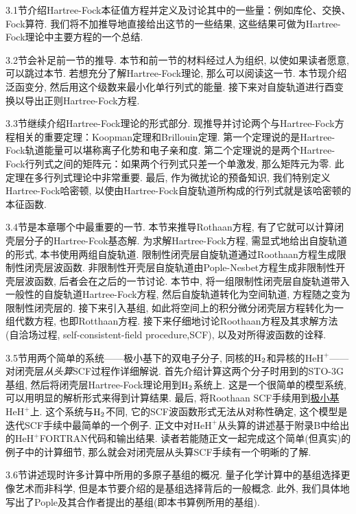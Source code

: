 3.1节介绍Hartree-Fock本征值方程并定义及讨论其中的一些量：例如库伦、交换、Fock算符. 我们将不加推导地直接给出这节的一些结果, 这些结果可做为Hartree-Fock理论中主要方程的一个总结.

3.2节会补足前一节的推导. 本节和前一节的材料经过人为组织, 以使如果读者愿意, 可以跳过本节. 若想充分了解Hartree-Fock理论, 那么可以阅读这一节. 本节现介绍泛函变分, 然后用这个级数来最小化单行列式的能量. 接下来对自旋轨道进行酉变换以导出正则Hartree-Fock方程.

3.3节继续介绍Hartree-Fock理论的形式部分. 现推导并讨论两个与Hartree-Fock方程相关的重要定理：Koopman定理和Brillouin定理. 第一个定理说的是Hartree-Fock轨道能量可以堪称离子化势和电子亲和度. 第二个定理说的是两个Hartree-Fock行列式之间的矩阵元：如果两个行列式只差一个单激发, 那么矩阵元为零. 此定理在多行列式理论中非常重要. 最后, 作为微扰论的预备知识, 我们特别定义Hartree-Fock哈密顿, 以使由Hartree-Fock自旋轨道所构成的行列式就是该哈密顿的本征函数.

3.4节是本章哪个中最重要的一节. 本节来推导Rothaan方程, 有了它就可以计算闭壳层分子的Hartree-Fcok基态解. 为求解Hartree-Fock方程, 需显式地给出自旋轨道的形式, 本书使用两组自旋轨道. 限制性闭壳层自旋轨道通过Roothaan方程生成限制性闭壳层波函数. 非限制性开壳层自旋轨道由Pople-Nesbet方程生成非限制性开壳层波函数, 后者会在之后的一节讨论. 本节中, 将一组限制性闭壳层自旋轨道带入一般性的自旋轨道Hartree-Fock方程, 然后自旋轨道转化为空间轨道, 方程随之变为限制性闭壳层的. 接下来引入基组, 如此将空间上的积分微分闭壳层\hft 方程转化为一组代数方程, 也即Rotthaan方程. 接下来仔细地讨论Roothaan方程及其求解方法(自洽场过程, self-consistent-field procedure,SCF), 以及对所得波函数的诠释.

3.5节用两个简单的系统——极小基下的双电子分子, 同核的$\mathrm{H}_2$和异核的$\mathrm{HeH}^+$——对闭壳层\emph{从头算}SCF过程作详细解说. 首先介绍计算这两个分子时用到的STO-3G基组, 然后将闭壳层Hartree-Fock理论用到$\mathrm{H}_2$系统上. 这是一个很简单的模型系统, 可以用明显的解析形式来得到计算结果. 最后, 将Roothaan SCF手续用到\underline{极小基$\mathrm{HeH}^+$}上. 这个系统与$\mathrm{H}_2$不同, 它的SCF波函数形式无法从对称性确定, 这个模型是迭代SCF手续中最简单的一个例子. 正文中对$\mathrm{HeH}^+$从头算的讲述基于附录B中给出的$\mathrm{HeH}^+$FORTRAN代码和输出结果. 读者若能随正文一起完成这个简单(但真实)的例子中的计算细节, 那么就会对闭壳层从头算SCF手续有一个明晰的了解.

3.6节讲述现时许多计算中所用的多原子基组的概况. 量子化学计算中的基组选择更像艺术而非科学, 但是本节要介绍的是基组选择背后的一般概念. 此外, 我们具体地写出了Pople及其合作者提出的基组(即本书算例所用的基组).  

